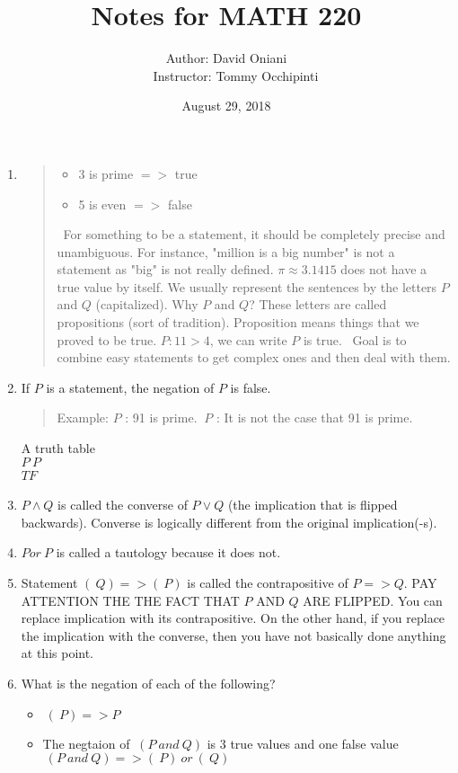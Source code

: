 \documentclass[12pt, a4paper]{article}             %
\title{\bf{Notes for MATH 220}}
\author{Author: David Oniani
\\
\ \ \ Instructor: Tommy Occhipinti}
\date{August 29, 2018}
\begin{document}
\maketitle


\begin{enumerate}
\item
{}

\begin{quote}
\begin{itemize}
\item
3 is prime $=>$ true
\item
5 is even $=>$ false
\end{itemize}
\
For something to be a statement, it should be completely precise and unambiguous.
For instance, "million is a big number" is not a statement as "big" is not really defined.
$\pi \approx 3.1415$ does not have a true value by itself.
We usually represent the sentences by the letters $P$ and $Q$ (capitalized).
Why $P$ and $Q$? These letters are called propositions (sort of tradition).
Proposition means things that we proved to be true.
$P : 11 > 4$, we can write $P$ is true.
\
Goal is to combine easy statements to get complex ones and then deal with them.
\end{quote}

\item
If $P$ is a statement, the negation of $P$ is false.
\begin{quote}
Example: $P$ : 91 is prime.
$~P$ : It is not the case that 91 is prime.
\end{quote}

A truth table
\\
$P  ~P$ \\
$T   F$
\

\item
$P \wedge Q$ is called the converse of $P \vee Q$ (the implication that is flipped backwards).
Converse is logically different from the original implication(-s).

\item
$P or ~P$ is called a tautology because it does not.

\item
Statement $(~Q) => (~P)$ is called the contrapositive of $P => Q$.
PAY ATTENTION THE THE FACT THAT $P$ AND $Q$ ARE FLIPPED.
You can replace implication with its contrapositive. On the other hand,
if you replace the implication with the converse, then you have not
basically done anything at this point.

\item
What is the negation of each of the following?

\begin{itemize}
\item
$~(~P) => P$
\item
The negtaion of $~(P \ and \ Q)$ is 3 true values and one false value \
$~(P \ and \ Q) => (~P) \ or \ (~Q)$
\end{itemize}

\end{enumerate}
\end{document}
